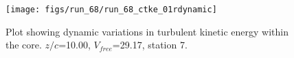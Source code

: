 \begin{figure}[H]
\centering
\texttt{[image: figs/run\_68/run\_68\_ctke\_01rdynamic]}
\caption{Plot showing dynamic variations in turbulent kinetic energy within the core. $z/c$=10.00, $V_{free}$=29.17, station 7.}
\label{fig:run_68_ctke_01rdynamic}
\end{figure}


